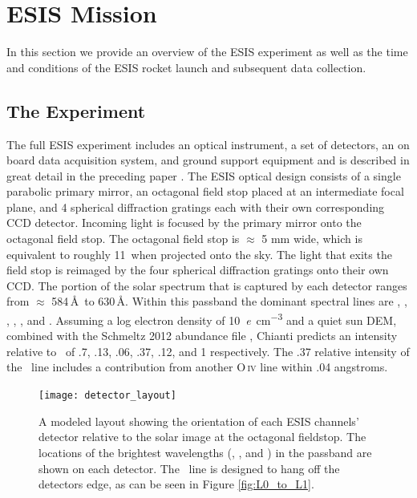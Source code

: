 \section{ESIS Mission}

In this section we provide an overview of the ESIS experiment as well as the time and conditions of the ESIS rocket launch and subsequent data collection.   

	\subsection{The Experiment}
	  	
    	The full ESIS experiment includes an optical instrument, a set of detectors, an on board data acquisition system, and ground support equipment and is described in great detail in the preceding paper \citep{ESIS}.
    	The ESIS optical design consists of a single parabolic primary mirror, an octagonal field stop placed at an intermediate focal plane, and 4 spherical diffraction gratings each with their own corresponding CCD detector.
    	Incoming light is focused by the primary mirror onto the octagonal field stop. 
    	The octagonal field stop is $\approx$ 5 mm wide, which is equivalent to roughly 11\arcmin \  when projected onto the sky. 
    	The light that exits the field stop is reimaged  by the four spherical diffraction gratings onto their own CCD.
    	The portion of the solar spectrum that is captured by each detector ranges from $\approx$ 584\,\AA \ to 630\,\AA. 
    	Within this passband the dominant spectral lines are \hei, \oiii, \oiv, \mgxbright, \mgxdim, and \ov.
    	Assuming a log electron density of \SI[per-mode=symbol]{10}{\elementarycharge\per\cm^3} and a quiet sun DEM, combined with the Schmeltz 2012 abundance file \citep{schmelz2012}, Chianti \citep{ChiantiI,ChiantiX} predicts an intensity relative to \ov \ of .7, .13, .06, .37, .12, and 1 respectively.
    	The .37 relative intensity of the \mgxbright \ line includes a contribution from another O\,\textsc{iv} line within .04 angstroms.
    	
    
 
    	
        \begin{figure}[ht]
			\begin{center}
				\texttt{[image: detector\_layout]}
				\caption{A modeled layout showing the orientation of each ESIS channels' detector relative to the solar image at the octagonal fieldstop.  The locations of the brightest wavelengths (\hei, \mgxbright, and \ov) in the passband are shown on each detector.  The \hei \ line is designed to hang off the detectors edge, as can be seen in Figure \ref{fig:L0_to_L1}. }
				\label{fig:level_1_array}
			\end{center}
		\end{figure}

